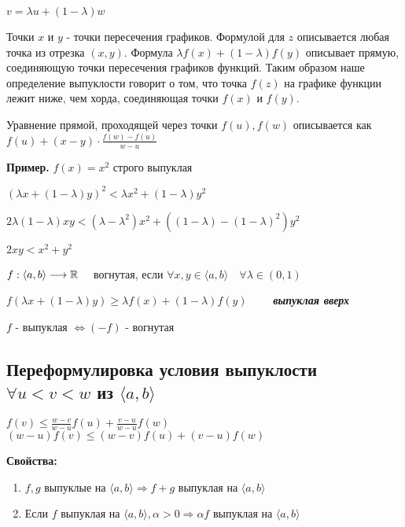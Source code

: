 \begin{conj}
    $v = \lambda u + (1 - \lambda)w$

    Точки $x$ и $y$ - точки пересечения графиков. Формулой для $z$ описывается любая точка 
    из отрезка $(x,y)$. Формула $\lambda f(x) + (1-\lambda)f(y)$ описывает прямую, соединяющую 
    точки пересечения графиков функций. Таким образом наше определение выпуклости 
    говорит о том, что точка $f(z)$ на графике функции лежит ниже, чем хорда, соединяющая 
    точки $f(x)$ и $f(y)$.

    Уравнение прямой, проходящей через точки $f(u), f(w)$ описывается как 
    $f(u) + (x - y) \cdot \frac{f(w) - f(u)}{w - u}$
\end{conj}

\textbf{Пример.} $f(x) = x^2$  строго выпуклая 

$(\lambda x + (1 - \lambda)y)^2 < \lambda x^2 + (1 - \lambda)y^2$

$2 \lambda (1 - \lambda)xy < (\lambda - {\lambda}^2)x^2 + ((1 - \lambda) -
(1 - \lambda)^2)y^2$

$2xy < x^2 + y^2$

\begin{conj}
    $f: \langle a, b \rangle \longrightarrow \mathbb{R} \quad$ вогнутая, если  
    $\forall x, y \in \langle a, b \rangle \quad \forall \lambda \in (0, 1)$

    $f(\lambda x + (1-\lambda)y) \geqslant \lambda f(x) + (1 - \lambda) f(y) \qquad$ \textit{\textbf{выпуклая вверх}}
\end{conj}

\notice $f$ - выпуклая $\Longleftrightarrow (-f)$ - вогнутая

\subsection*{Переформулировка условия выпуклости $\forall u < v < w$ из $\langle a, b \rangle$}

$f(v) \leqslant \frac{w - v}{w - u}f(u) + \frac{v - u}{w - u}f(w)$ \qquad 
$(w - u)f(v) \leqslant (w - v)f(u) + (v - u)f(w)$

\textbf{Свойства: }
\begin{enumerate}
    \item $f, g$ выпуклые на $\langle a, b \rangle \Longrightarrow f + g$ выпуклая на $\langle a, b \rangle$
    \item Если $f$ выпуклая на $\langle a, b \rangle, \alpha > 0 \Longrightarrow \alpha f$ выпуклая на $\langle a, b \rangle$
\end{enumerate}

